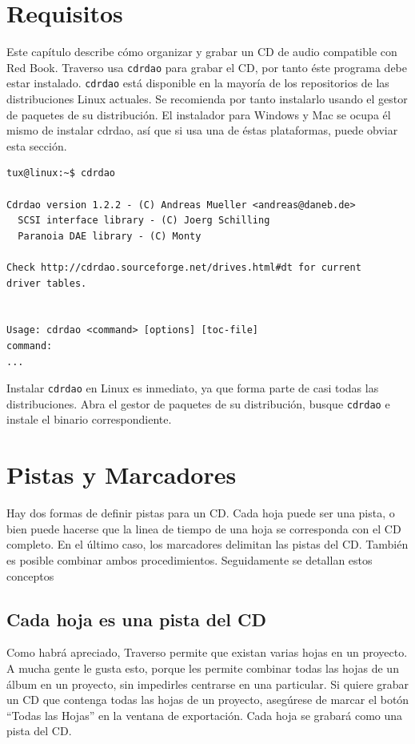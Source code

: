 ﻿\section{Requisitos}
Este capítulo describe cómo organizar y grabar un CD de audio compatible con Red Book. Traverso usa \texttt{cdrdao} para grabar el CD, por tanto éste programa debe estar instalado. \texttt{cdrdao} está disponible en la mayoría de los repositorios de las distribuciones Linux actuales. Se recomienda por tanto instalarlo usando el gestor de paquetes de su distribución. El instalador para Windows y Mac se ocupa él mismo de instalar cdrdao, así que si usa una de éstas plataformas, puede obviar esta sección.

\footnotesize
\begin{verbatim}
tux@linux:~$ cdrdao

Cdrdao version 1.2.2 - (C) Andreas Mueller <andreas@daneb.de>
  SCSI interface library - (C) Joerg Schilling
  Paranoia DAE library - (C) Monty

Check http://cdrdao.sourceforge.net/drives.html#dt for current 
driver tables.


Usage: cdrdao <command> [options] [toc-file]
command:
...
\end{verbatim}
\normalsize

Instalar \texttt{cdrdao} en Linux es inmediato, ya que forma parte de casi todas las distribuciones. Abra el gestor de paquetes de su distribución, busque \texttt{cdrdao} e instale el binario correspondiente.

\section{Pistas y Marcadores}
Hay dos formas de definir pistas para un CD. Cada hoja puede ser una pista, o bien puede hacerse que la linea de tiempo de una hoja se corresponda con el CD completo. En el último caso, los marcadores delimitan las pistas del CD. También es posible combinar ambos procedimientos. Seguidamente se detallan estos conceptos

\subsection{Cada hoja es una pista del CD}
Como habrá apreciado, Traverso permite que existan varias hojas en un proyecto. A mucha gente le gusta esto, porque les permite combinar todas las hojas de un álbum en un proyecto, sin impedirles centrarse en una particular. Si quiere grabar un CD que contenga todas las hojas de un proyecto, asegúrese de marcar el botón ``Todas las Hojas'' en la ventana de exportación. Cada hoja se grabará como una pista del CD.

